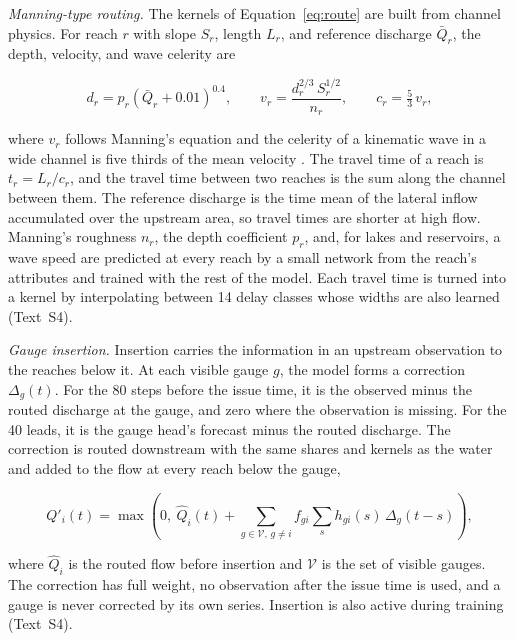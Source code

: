 \documentclass[draft]{agujournal2019}
\begin{document}
\textit{Manning-type routing.} The kernels of Equation~\ref{eq:route} are built from channel physics. For reach $r$ with slope $S_r$, length $L_r$, and reference discharge $\bar{Q}_r$, the depth, velocity, and wave celerity are
\begin{linenomath*}
\begin{equation}
d_r = p_r\left(\bar{Q}_r + 0.01\right)^{0.4},
\qquad
v_r = \frac{d_r^{2/3}\,S_r^{1/2}}{n_r},
\qquad
c_r = \tfrac{5}{3}\,v_r,
\label{eq:manning}
\end{equation}
\end{linenomath*}
where $v_r$ follows Manning's equation \cite{Chow1959} and the celerity of a kinematic wave in a wide channel is five thirds of the mean velocity \cite{Lighthill1955}. The travel time of a reach is $t_r = L_r / c_r$, and the travel time between two reaches is the sum along the channel between them. The reference discharge is the time mean of the lateral inflow accumulated over the upstream area, so travel times are shorter at high flow. Manning's roughness $n_r$, the depth coefficient $p_r$, and, for lakes and reservoirs, a wave speed are predicted at every reach by a small network from the reach's attributes and trained with the rest of the model. Each travel time is turned into a kernel by interpolating between 14 delay classes whose widths are also learned (Text~S4).

\textit{Gauge insertion.} Insertion carries the information in an upstream observation to the reaches below it. At each visible gauge $g$, the model forms a correction $\Delta_g(t)$. For the 80 steps before the issue time, it is the observed minus the routed discharge at the gauge, and zero where the observation is missing. For the 40 leads, it is the gauge head's forecast minus the routed discharge. The correction is routed downstream with the same shares and kernels as the water and added to the flow at every reach below the gauge,
\begin{linenomath*}
\begin{equation}
Q'_i(t) = \max\!\left(0,\ \hat{Q}_i(t) + \sum_{g \in \mathcal{V},\, g \neq i} f_{gi} \sum_{s} h_{gi}(s)\, \Delta_g(t-s)\right),
\label{eq:insert}
\end{equation}
\end{linenomath*}
where $\hat{Q}_i$ is the routed flow before insertion and $\mathcal{V}$ is the set of visible gauges. The correction has full weight, no observation after the issue time is used, and a gauge is never corrected by its own series. Insertion is also active during training (Text~S4).
\end{document}
